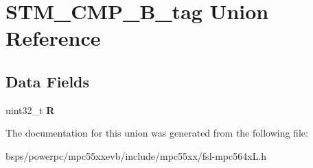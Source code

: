 \hypertarget{unionSTM__CMP__32B__tag}{}\section{S\+T\+M\+\_\+\+C\+M\+P\+\_\+B\+\_\+tag Union Reference}
\label{unionSTM__CMP__32B__tag}
\subsection*{Data Fields}
\begin{DoxyCompactItemize}
\item 
\mbox{\label{unionSTM__CMP__32B__tag_a72bfc8ffd8c1486d5702c8939e3d09ef}} 
uint32\+\_\+t {\bfseries R}
\end{DoxyCompactItemize}


The documentation for this union was generated from the following file\+:\begin{DoxyCompactItemize}
\item 
bsps/powerpc/mpc55xxevb/include/mpc55xx/fsl-\/mpc564x\+L.\+h\end{DoxyCompactItemize}
